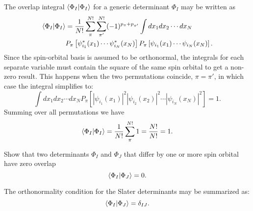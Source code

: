 \documentclass[../Main/chem532-notes.tex]{subfiles}
\begin{document}
The overlap integral $\braket{\Phi_I|\Phi_I}$ for a generic determinant $\Phi_I$ may be written as
\begin{equation}
\begin{split}
\braket{\Phi_I|\Phi_I} &= \frac{1}{N!}
\sum_{\pi}^{N!} \sum_{\pi'}^{N!} (-1)^{p_\pi + p_{\pi'}} \int dx_1 dx_2 \cdots dx_N \\
&
P_{\pi}\left[
\psi_{i_1}^{*}(x_1) \cdots \psi_{i_N}^{*}(x_N)
\right]
P_{\pi}\left[
\psi_{i_1}(x_1) \cdots \psi_{i_N}(x_N)
\right].
\end{split}
\end{equation}
Since the spin-orbital basis is assumed to be orthonormal, the integrals for each separate variable must contain the square of the same spin orbital to get a non-zero result.
This happens when the two permutations coincide, $\pi = \pi'$, in which case the integral simplifies to:
\begin{equation}
 \int dx_1 dx_2 \cdots dx_N 
P_{\pi}\left[
|\psi_{i_1}(x_1)|^2 |\psi_{i_2}(x_2)|^2 \cdots |\psi_{i_N}(x_N)|^2
\right] = 1.
\end{equation}
Summing over all permutations we have
\begin{equation}
\braket{\Phi_I | \Phi_I} = \frac{1}{N!}
\sum_{\pi}^{N!} 1 =  \frac{N!}{N!} = 1.
\end{equation}

\begin{problem}
Show that two determinants $\Phi_I$ and $\Phi_J$ that differ by one or more spin orbital have zero overlap
\begin{equation}
\braket{\Phi_I | \Phi_J} = 0.
\end{equation}
\end{problem}
The orthonormality condition for the Slater determinants may be summarized as:
\begin{equation}
\braket{\Phi_I | \Phi_J} = \delta_{IJ}.
\end{equation}
\end{document}
